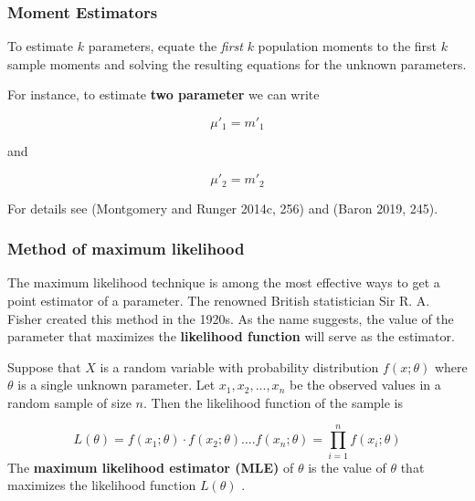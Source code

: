 \documentclass[
  11pt,
  letterpaper,
  DIV=11,
  numbers=noendperiod]{scrreprt}
\begin{document}
\subsubsection{Moment Estimators}\label{moment-estimators}

To estimate \(k\) parameters, equate the \emph{first} \(k\) population
moments to the first \(k\) sample moments and solving the resulting
equations for the unknown parameters.

For instance, to estimate \textbf{two parameter} we can write

\[\mu'_{1}=m'_{1}\]

and

\[\mu'_{2}=m'_{2}\]

For details see (Montgomery and Runger 2014c, 256) and (Baron 2019,
245).

\subsubsection{Method of maximum
likelihood}\label{method-of-maximum-likelihood}

The maximum likelihood technique is among the most effective ways to get
a point estimator of a parameter. The renowned British statistician Sir
R. A. Fisher created this method in the 1920s. As the name suggests, the
value of the parameter that maximizes the \textbf{likelihood function}
will serve as the estimator.

\begin{tcolorbox}[enhanced jigsaw, bottomrule=.15mm, toprule=.15mm, title=\textcolor{quarto-callout-note-color}{\faInfo}\hspace{0.5em}{Maximum Likelihood Estimator}, bottomtitle=1mm, colframe=quarto-callout-note-color-frame, coltitle=black, rightrule=.15mm, toptitle=1mm, colbacktitle=quarto-callout-note-color!10!white, titlerule=0mm, breakable, arc=.35mm, leftrule=.75mm, opacitybacktitle=0.6, opacityback=0, colback=white, left=2mm]

Suppose that \(X\) is a random variable with probability distribution
\(f (x;\theta )\) where \(\theta\) is a single unknown parameter. Let
\(x_1,x_2,...,x_n\) be the observed values in a random sample of size
\(n\). Then the likelihood function of the sample is

\[L(\theta)=f(x_1;\theta)\cdot f(x_2;\theta)....f(x_n;\theta)=\prod_{i=1}^n f(x_i;\theta)\]
The \textbf{maximum likelihood estimator (MLE)} of \(\theta\) is the
value of \(\theta\) that maximizes the likelihood function \(L(\theta)\)
.

\end{tcolorbox}
\end{document}

